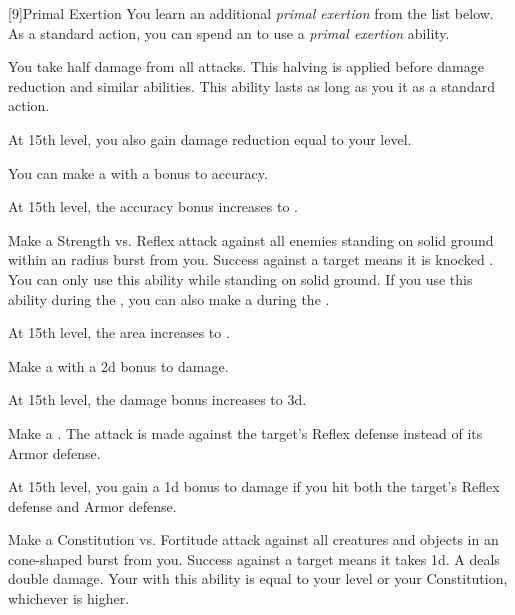         [9]{Primal Exertion}
        You learn an additional \textit{primal exertion} from the list below.
        As a standard action, you can spend an  to use a \textit{primal exertion} ability.
        {
             You take half damage from all attacks.
            This halving is applied before damage reduction and similar abilities.
            This ability lasts as long as you  it as a standard action.

            \par At 15th level, you also gain damage reduction equal to your level.

             You can make a  with a  bonus to accuracy.

            \par At 15th level, the accuracy bonus increases to .

             Make a Strength vs. Reflex attack against all enemies standing on solid ground within an \areamed radius burst from you.
            Success against a target means it is knocked \prone.
            You can only use this ability while standing on solid ground.
            If you use this ability during the , you can also make a  during the .

            \par At 15th level, the area increases to \arealarge.

             Make a  with a \plus2d bonus to damage.

            \par At 15th level, the damage bonus increases to \plus3d.

             Make a .
            The attack is made against the target's Reflex defense instead of its Armor defense.

            \par At 15th level, you gain a \plus1d bonus to damage if you hit both the target's Reflex defense and Armor defense.

             Make a Constitution vs. Fortitude attack against all creatures and objects in an \arealarge cone-shaped burst from you.
            Success against a target means it takes  \plus1d.
            A  deals double damage.
            Your  with this ability is equal to your level or your Constitution, whichever is higher.

}
